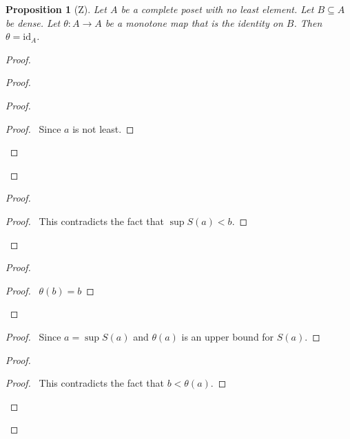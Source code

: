 \documentclass{book}
\let\qed\relax
\newtheorem{prop}[ax]{Proposition}
\theoremstyle{definition}
\begin{document}
\begin{prop}[Z]
\label{prop:orderisoid}
Let $A$ be a complete poset with no least element. Let $B \subseteq A$ be dense. Let $\theta : A \rightarrow A$ be a monotone map that is the identity on $B$. Then $\theta = \mathrm{id}_A$.
\end{prop}

\begin{proof}
\pf
{}
\begin{proof}
	\begin{proof}
		\begin{proof}
			\pf\ Since $a$ is not least.
		\end{proof}
	\end{proof}
\end{proof}
\begin{proof}
	\qedstep
	\begin{proof}
		\pf\ This contradicts the fact that $\sup S(a) < b$.
	\end{proof}
\end{proof}
\begin{proof}
	\begin{proof}
		\pf\ $\theta(b) = b$
	\end{proof}
\end{proof}
\begin{proof}
	\pf\ Since $a = \sup S(a)$ and $\theta(a)$ is an upper bound for $S(a)$.
\end{proof}
\begin{proof}
	\qedstep
	\begin{proof}
		\pf\ This contradicts the fact that $b < \theta(a)$.
	\end{proof}
\end{proof}
\qed
\end{proof}
\end{document}
